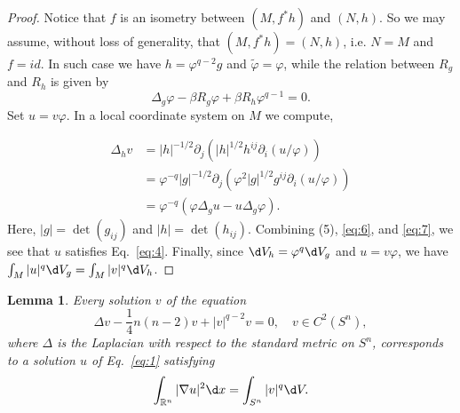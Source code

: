 \documentclass[11pt]{article}
\newtheorem{lemma}{Lemma}
\begin{document}
\begin{proof}
  Notice that $f$ is an isometry between $\left(M, f^* h\right)$ and $(N, h)$. So we may assume, without loss of generality, that $\left(M, f^* h\right)=(N, h)$, i.e. $N=M$ and $f=i d$. In such case we have $h=\varphi^{q-2} g$ and $\tilde{\varphi}=\varphi$, while the relation between $R_g$ and $R_h$ is given by
  \begin{equation}\label{eq:6}
    \Delta_g \varphi-\beta R_g \varphi+\beta R_h \varphi^{q-1}=0 .    
  \end{equation}
  Set $u=v \varphi$. In a local coordinate system on $M$ we compute,
  
  \begin{equation}\label{eq:7}
    \begin{aligned}
    \Delta_h v & =|h|^{-1 / 2} \partial_j\left(|h|^{1 / 2} h^{i j} \partial_i(u / \varphi)\right) \\
    & =\varphi^{-q}|g|^{-1 / 2} \partial_j\left(\varphi^2|g|^{1 / 2} g^{i j} \partial_i(u / \varphi)\right) \\
    & =\varphi^{-q}\left(\varphi \Delta_g u-u \Delta_g \varphi\right) .
    \end{aligned}
  \end{equation}
  Here, $|g|=\det\left(g_{ij}\right)$ and $|h|=\det\left(h_{ij}\right)$.
  Combining (5), \eqref{eq:6}, and \eqref{eq:7}, we see that $u$ satisfies
  Eq.~\eqref{eq:4}.
  Finally, since $\d V_h = \varphi^q \d V_g$ and $u=v \varphi$,
  we have $\int_M|u|^q \d V_g=\int_M|v|^q \d V_h$.
\end{proof}


\begin{lemma}\label{lemma:2}
  Every solution $v$ of the equation
  \begin{equation}\label{eq:8}
    \Delta v-\frac{1}{4} n(n-2) v+|v|^{q-2} v=0, \quad v \in C^2\left(S^n\right),  
  \end{equation}
  where $\Delta$ is the Laplacian with respect to the standard metric on $S^n$,
  corresponds to a solution $u$ of Eq.~\eqref{eq:1} satisfying
  \begin{equation}\label{eq:9}
    \int_{\mathbb{R}^n}|\nabla u|^2 \d x=\int_{S^n}|v|^q \d V.  
  \end{equation}
\end{lemma}
\end{document}
